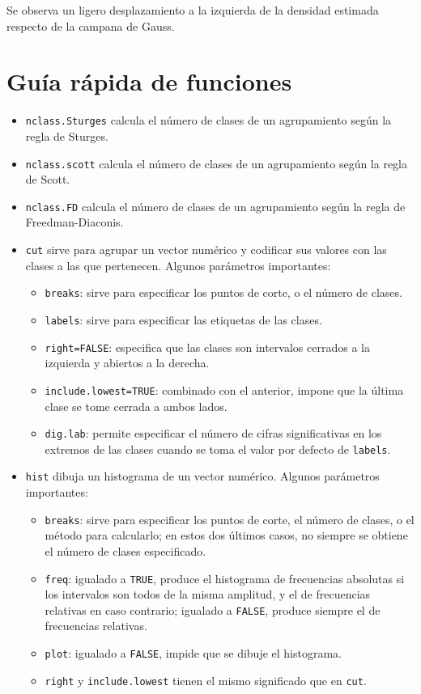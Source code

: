 \documentclass[
]{book}
\providecommand{\tightlist}{%
  \setlength{\itemsep}{0pt}\setlength{\parskip}{0pt}}
\theoremstyle{definition}
\theoremstyle{definition}
\theoremstyle{definition}
\theoremstyle{remark}
\begin{document}
Se observa un ligero desplazamiento a la izquierda de la densidad estimada respecto de la campana de Gauss.

\hypertarget{guuxeda-ruxe1pida-de-funciones-7}{%
\section{Guía rápida de funciones}\label{guuxeda-ruxe1pida-de-funciones-7}}

\begin{itemize}
\item
  \texttt{nclass.Sturges} calcula el número de clases de un agrupamiento según la regla de Sturges.
\item
  \texttt{nclass.scott} calcula el número de clases de un agrupamiento según la regla de Scott.
\item
  \texttt{nclass.FD} calcula el número de clases de un agrupamiento según la regla de Freedman-Diaconis.
\item
  \texttt{cut} sirve para agrupar un vector numérico y codificar sus valores con las clases a las que pertenecen. Algunos parámetros importantes:

  \begin{itemize}
  \tightlist
  \item
    \texttt{breaks}: sirve para especificar los puntos de corte, o el número de clases.
  \item
    \texttt{labels}: sirve para especificar las etiquetas de las clases.
  \item
    \texttt{right=FALSE}: especifica que las clases son intervalos cerrados a la izquierda y abiertos a la derecha.
  \item
    \texttt{include.lowest=TRUE}: combinado con el anterior, impone que la última clase se tome cerrada a ambos lados.
  \item
    \texttt{dig.lab}: permite especificar el número de cifras significativas en los extremos de las clases cuando se toma el valor por defecto de \texttt{labels}.
  \end{itemize}
\item
  \texttt{hist} dibuja un histograma de un vector numérico. Algunos parámetros importantes:

  \begin{itemize}
  \item
    \texttt{breaks}: sirve para especificar los puntos de corte, el número de clases, o el método para calcularlo; en estos dos últimos casos, no siempre se obtiene el número de clases especificado.
  \item
    \texttt{freq}: igualado a \texttt{TRUE}, produce el histograma de frecuencias absolutas si los intervalos son todos de la misma amplitud, y el de frecuencias relativas en caso contrario; igualado a \texttt{FALSE}, produce siempre el de frecuencias relativas.
  \item
    \texttt{plot}: igualado a \texttt{FALSE}, impide que se dibuje el histograma.
  \item
    \texttt{right} y \texttt{include.lowest} tienen el mismo significado que en \texttt{cut}.
  \end{itemize}


\end{itemize}
\end{document}
